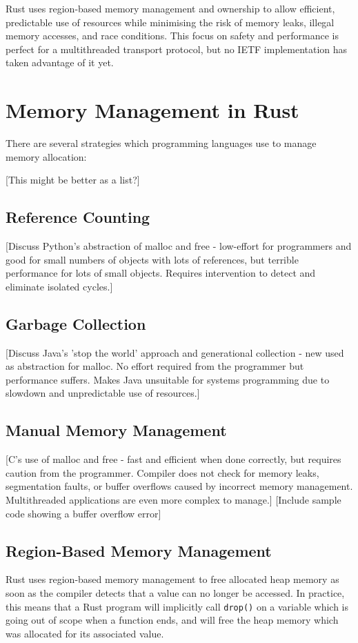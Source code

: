 \documentclass{l4proj}
\begin{document}
Rust uses region-based memory management and ownership to allow efficient, predictable use of resources while minimising the risk of memory leaks, illegal memory accesses, and race conditions. This focus on safety and performance is perfect for a multithreaded transport protocol, but no IETF implementation has taken advantage of it yet.

\section{Memory Management in Rust}
There are several strategies which programming languages use to manage memory allocation:

[This might be better as a list?]

\subsection{Reference Counting}
[Discuss Python's abstraction of malloc and free - low-effort for programmers and good for small numbers of objects with lots of references, but terrible performance for lots of small objects. Requires intervention to detect and eliminate isolated cycles.]

\subsection{Garbage Collection}
[Discuss Java's 'stop the world' approach and generational collection - new used as abstraction for malloc. No effort required from the programmer but performance suffers. Makes Java unsuitable for systems programming due to slowdown and unpredictable use of resources.]

\subsection{Manual Memory Management}
[C's use of malloc and free - fast and efficient when done correctly, but requires caution from the programmer. Compiler does not check for memory leaks, segmentation faults, or buffer overflows caused by incorrect memory management. Multithreaded applications are even more complex to manage.]
[Include sample code showing a buffer overflow error]

\subsection{Region-Based Memory Management}
Rust uses region-based memory management to free allocated heap memory as soon as the compiler detects that a value can no longer be accessed. In practice, this means that a Rust program will implicitly call \texttt{drop()} on a variable which is going out of scope when a function ends, and will free the heap memory which was allocated for its associated value.
\end{document}
